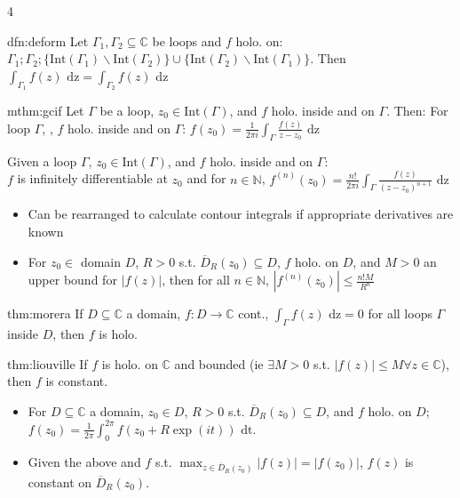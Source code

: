 \documentclass[landscape, 8pt]{extarticle}
\begin{document}
\begin{multicols*}{4}
	
	\begin{thm}{dfn:deform}{ }
		Let $\Gamma_1, \Gamma_2 \subseteq \mathbb{C}$ be loops and $f$ holo. on: $\Gamma_1; \Gamma_2; \{\text{Int}(\Gamma_1) \backslash \text{Int}(\Gamma_2)\} \cup \{\text{Int}(\Gamma_2) \backslash \text{Int}(\Gamma_1)\}$. Then $\int_{\Gamma_1}f(z) \text{ dz} = \int_{\Gamma_2}f(z) \text{ dz}$
		
		
	\end{thm}
	
	
	\begin{mthm}{mthm:gcif}{ }
		Let $\Gamma$ be a loop, $z_0 \in \text{Int}(\Gamma)$, and $f$ holo. inside and on $\Gamma$. Then:
		For loop $\Gamma$, , $f$ holo. inside and on $\Gamma$: $f(z_0) = \frac{1}{2 \pi i} \int_{\Gamma}\frac{f(z)}{z-z_0} \text{ dz}$
		
		
		
		Given a loop $\Gamma$, $z_0 \in \text{Int}(\Gamma)$, and $f$ holo. inside and on $\Gamma$:\\ $f$ is infinitely differentiable at $z_0$ and for $n \in \mathbb{N}$, $f^{(n)}(z_0) = \frac{n!}{2 \pi i} \int_{\Gamma}\frac{f(z)}{(z-z_0)^{n+1}} \text{ dz}$
		
		\begin{itemize}
			\item Can be rearranged to calculate contour integrals if appropriate derivatives are known
			\item For $z_0 \in$ domain $D$, $R > 0$ s.t. $\overline{D}_R(z_0) \subseteq D$, $f$ holo. on $D$, and $M>0$ an upper bound for $\left|f(z)\right|$, then for all $n \in \mathbb{N}$, $\left|f^{(n)}(z_0)\right| \le \frac{n!M}{R^n}$
		\end{itemize}
		
	\end{mthm}	
	
	
	\begin{thm}{thm:morera}{ }
		If $D \subseteq \mathbb{C}$ a domain, $f: D \to \mathbb{C}$ cont., $\int_{\Gamma}f(z) \text{ dz} = 0$ for all loops $\Gamma$ inside $D$, then $f$ is holo.
		
	\end{thm}
	
	
	\begin{thm}{thm:liouville}{ }
		If $f$ is holo. on $\mathbb{C}$ and bounded (ie $\exists M > 0$ s.t. $\left|f(z)\right| \le M \forall z \in \mathbb{C}$), then $f$ is constant.
		\begin{itemize}
			\item For $D \subseteq \mathbb{C}$ a domain, $z_0 \in D$, $R>0$ s.t. $\overline{D}_R(z_0) \subseteq D$, and $f$ holo. on $D$;\\
			$f(z_0) = \frac{1}{2 \pi} \int_{0}^{2 \pi}f(z_0 + R \exp(it)) \text{ dt}.$
			\item Given the above and $f$ s.t. $\max_{z \in \overline{D}_R(z_0)}\left|f(z)\right| = \left|f(z_0)\right|$, $f(z)$ is constant on $\overline{D}_R(z_0)$.
		\end{itemize}
		

\end{thm}
\end{multicols*}
\end{document}
